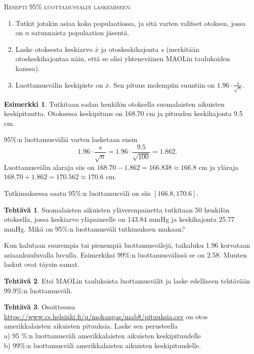 \documentclass[12pt,leqno,a4paper,oneside]{amsart}
\theoremstyle{definition}
\newtheorem{example}[proclaim]{Esimerkki}
\newtheorem{exercise}{Tehtävä}
\theoremstyle{remark}
\numberwithin{equation}{section}
\begin{document}
\textsc{Resepti 95\% luottamusvälin laskemiseen:}\\
\begin{enumerate}
 \item 
 Tutkit jotakin asiaa koko populaatiossa, ja sitä varten valitset otoksen, jossa on $n$ satunnaista populaation jäsentä.
 \item
 Laske otoksesta keskiarvo $\bar{x}$ ja otoskeskihajonta $s$ (merkitään otoskeskihajontaa näin, että se olisi yhteneväinen MAOLin tau\-lu\-koi\-den kanssa).
 \item
 Luottamusvälin keskipiste on $\bar{x}$. Sen pituus molempiin suuntiin on $1.96\cdot\frac{s}{\sqrt{n}} .$
\end{enumerate}

\begin{example}
 Tutkitaan sadan henkilön otoksella suomalaisten aikuisten keskipituutta. Otoksessa keskipituus on 168.70 cm ja pituuden keskihajonta 9.5 cm.
 
 95\%:n luottamusväliä varten lasketaan ensin
 $$ 1.96\cdot\frac{s}{\sqrt{n}} = 1.96\cdot\frac{9.5}{\sqrt{100}} = 1.862.$$
 Luottamusvälin alaraja siis on $168.70 - 1.862 = 166.838 \approx 166.8$ cm ja yläraja $168.70 + 1.862 = 170.562 \approx 170.6$ cm.

 Tutkimuksessa saatu 95\%:n luottamusväli on siis $[166.8 , 170.6].$
\end{example}

\begin{exercise}
 Suomalaisten aikuisten yläverenpainetta tutkitaan 50 henkilön otoksella, jossa keskiarvo yläpaineelle on 143.84 mmHg ja keskihajonta 25.77 mmHg.
 Mikä on 95\%:n luottamusväli tutkimuksen mukaan?
\end{exercise}

Kun halutaan suurempia tai pienempiä luottamusvälejä, taikaluku 1.96 korvataan asiaankuuluvalla luvulla. Esimerkiksi 99\%:n luottamusvälissä se on
2.58. Muuten laskut ovat täysin samat.

\begin{exercise}
 Etsi MAOLin taulukoista luottamusvälit ja laske edelliseen tehtävään 99.9\%:n luottamusväli.
\end{exercise}

\begin{exercise}
 Osoitteessa \url{https://www.cs.helsinki.fi/u/mokangas/mab8/pituuksia.csv} on otos amerikkalaisten aikuisten pituuksia. Laske sen perusteella\\
 a) 95 \%:n luottamusväli amerikkalaisten aikuisten keskipituudelle\\
 b) 99\%:n luottamusväli amerikkalaisten aikuisten keskipituudelle.
\end{exercise}
\end{document}
